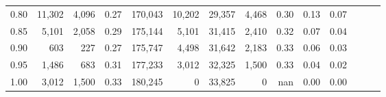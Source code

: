 \begin{tabular}{rrrrrrrrrrrrrr}
0.80 &  11,302 &  4,096 &  0.27 &  170,043 &   10,202 &  29,357 &   4,468 &  0.30 &  0.13 &      0.07 \\
0.85 &   5,101 &  2,058 &  0.29 &  175,144 &    5,101 &  31,415 &   2,410 &  0.32 &  0.07 &      0.04 \\
0.90 &     603 &    227 &  0.27 &  175,747 &    4,498 &  31,642 &   2,183 &  0.33 &  0.06 &      0.03 \\
0.95 &   1,486 &    683 &  0.31 &  177,233 &    3,012 &  32,325 &   1,500 &  0.33 &  0.04 &      0.02 \\
1.00 &   3,012 &  1,500 &  0.33 &  180,245 &        0 &  33,825 &       0 &   nan &  0.00 &      0.00 \\
\bottomrule
\end{tabular}
